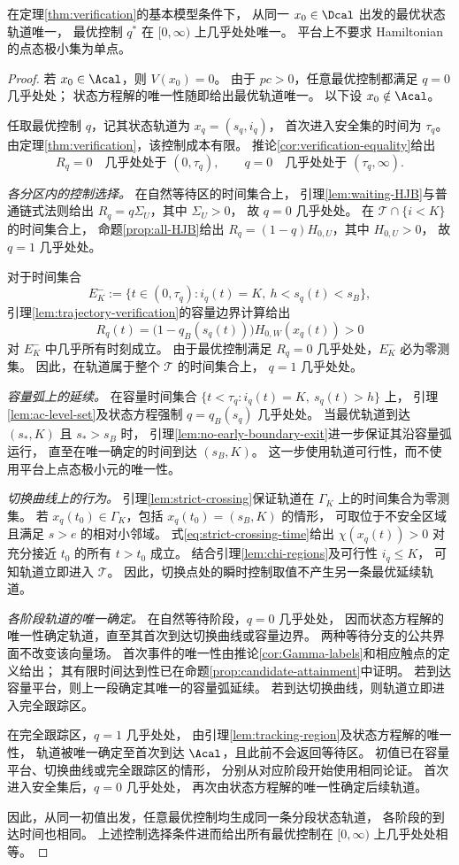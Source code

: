 \begin{theorem}[全时间轴上的几乎处处唯一性]
\label{thm:unique-q}
在定理\ref{thm:verification}的基本模型条件下，
从同一 $x_0\in\Dcal$ 出发的最优状态轨道唯一，
最优控制 $q^*$ 在 $[0,\infty)$ 上几乎处处唯一。
平台上不要求 Hamiltonian 的点态极小集为单点。
\end{theorem}

\begin{proof}
若 $x_0\in\Acal$，则 $V(x_0)=0$。
由于 $pc>0$，任意最优控制都满足 $q=0$ 几乎处处；
状态方程解的唯一性随即给出最优轨道唯一。
以下设 $x_0\notin\Acal$。

任取最优控制 $q$，记其状态轨道为 $x_q=(s_q,i_q)$，
首次进入安全集的时间为 $\tau_q$。
由定理\ref{thm:verification}，该控制成本有限。
推论\ref{cor:verification-equality}给出
\[
R_q=0\quad\text{几乎处处于 }(0,\tau_q),\qquad
q=0\quad\text{几乎处处于 }(\tau_q,\infty).
\]

\emph{各分区内的控制选择。}
在自然等待区的时间集合上，
引理\ref{lem:waiting-HJB}与普通链式法则给出
$R_q=q\Sigma_U$，其中 $\Sigma_U>0$，
故 $q=0$ 几乎处处。
在 $\mathcal T\cap\{i<K\}$ 的时间集合上，
命题\ref{prop:all-HJB}给出
$R_q=(1-q)H_{0,U}$，其中 $H_{0,U}>0$，
故 $q=1$ 几乎处处。

对于时间集合
\[
E_K^-:=\{t\in(0,\tau_q):i_q(t)=K,\ h<s_q(t)<s_B\},
\]
引理\ref{lem:trajectory-verification}的容量边界计算给出
\[
R_q(t)
=\bigl(1-q_B(s_q(t))\bigr)H_{0,W}(x_q(t))>0
\]
对 $E_K^-$ 中几乎所有时刻成立。
由于最优控制满足 $R_q=0$ 几乎处处，$E_K^-$ 必为零测集。
因此，在轨道属于整个 $\mathcal T$ 的时间集合上，
$q=1$ 几乎处处。

\emph{容量弧上的延续。}
在容量时间集合 $\{t<\tau_q:i_q(t)=K,\ s_q(t)>h\}$ 上，
引理\ref{lem:ac-level-set}及状态方程强制
$q=q_B(s_q)$ 几乎处处。
当最优轨道到达 $(s_*,K)$ 且 $s_*>s_B$ 时，
引理\ref{lem:no-early-boundary-exit}进一步保证其沿容量弧运行，
直至在唯一确定的时间到达 $(s_B,K)$。
这一步使用轨道可行性，而不使用平台上点态极小元的唯一性。

\emph{切换曲线上的行为。}
引理\ref{lem:strict-crossing}保证轨道在 $\Gamma_K$ 上的时间集合为零测集。
若 $x_q(t_0)\in\Gamma_K$，包括 $x_q(t_0)=(s_B,K)$ 的情形，
可取位于不安全区域且满足 $s>e$ 的相对小邻域。
式\eqref{eq:strict-crossing-time}给出
$\chi(x_q(t))>0$ 对充分接近 $t_0$ 的所有 $t>t_0$ 成立。
结合引理\ref{lem:chi-regions}及可行性 $i_q\le K$，
可知轨道立即进入 $\mathcal T$。
因此，切换点处的瞬时控制取值不产生另一条最优延续轨道。

\emph{各阶段轨道的唯一确定。}
在自然等待阶段，$q=0$ 几乎处处，
因而状态方程解的唯一性确定轨道，直至其首次到达切换曲线或容量边界。
两种等待分支的公共界面不改变该向量场。
首次事件的唯一性由推论\ref{cor:Gamma-labels}和相应触点的定义给出；
其有限时间达到性已在命题\ref{prop:candidate-attainment}中证明。
若到达容量平台，则上一段确定其唯一的容量弧延续。
若到达切换曲线，则轨道立即进入完全跟踪区。

在完全跟踪区，$q=1$ 几乎处处，
由引理\ref{lem:tracking-region}及状态方程解的唯一性，
轨道被唯一确定至首次到达 $\Acal$，且此前不会返回等待区。
初值已在容量平台、切换曲线或完全跟踪区的情形，
分别从对应阶段开始使用相同论证。
首次进入安全集后，$q=0$ 几乎处处，
再次由状态方程解的唯一性确定后续轨道。

因此，从同一初值出发，任意最优控制均生成同一条分段状态轨道，
各阶段的到达时间也相同。
上述控制选择条件进而给出所有最优控制在 $[0,\infty)$ 上几乎处处相等。
\end{proof}
